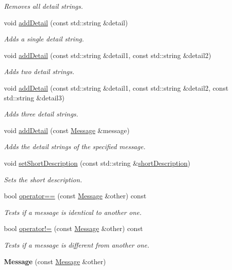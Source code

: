 \begin{DoxyCompactItemize}
\begin{DoxyCompactList}\small\item\em Removes all detail strings. \end{DoxyCompactList}\item 
void \hyperlink{class_message_a7cc56c24bc9d7516247cd865c472ab2f}{add\+Detail} (const std\+::string \&detail)
\begin{DoxyCompactList}\small\item\em Adds a single detail string. \end{DoxyCompactList}\item 
void \hyperlink{class_message_a2c67e0d82c3b4e3f3d21cec40537d6de}{add\+Detail} (const std\+::string \&detail1, const std\+::string \&detail2)
\begin{DoxyCompactList}\small\item\em Adds two detail strings. \end{DoxyCompactList}\item 
void \hyperlink{class_message_a9d83e2c5fd0d817291331e65830b824a}{add\+Detail} (const std\+::string \&detail1, const std\+::string \&detail2, const std\+::string \&detail3)
\begin{DoxyCompactList}\small\item\em Adds three detail strings. \end{DoxyCompactList}\item 
void \hyperlink{class_message_a576d9d2c563c11ff0a000d22bb235d1c}{add\+Detail} (const \hyperlink{class_message}{Message} \&message)
\begin{DoxyCompactList}\small\item\em Adds the detail strings of the specified message. \end{DoxyCompactList}\item 
void \hyperlink{class_message_a3f2362cf70c38b79a188dd8545d24d03}{set\+Short\+Description} (const std\+::string \&\hyperlink{class_message_a9bd82d96b57df5c4615b6cbbf318175a}{short\+Description})
\begin{DoxyCompactList}\small\item\em Sets the short description. \end{DoxyCompactList}\item 
bool \hyperlink{class_message_a30387c914e7f0125a38f2819b9f43e04}{operator==} (const \hyperlink{class_message}{Message} \&other) const 
\begin{DoxyCompactList}\small\item\em Tests if a message is identical to another one. \end{DoxyCompactList}\item 
bool \hyperlink{class_message_a5abc9c637b0c4ec2b7966ea06bd1401b}{operator!=} (const \hyperlink{class_message}{Message} \&other) const 
\begin{DoxyCompactList}\small\item\em Tests if a message is different from another one. \end{DoxyCompactList}\item 
\hypertarget{class_message_ad253b20930e70257e2523bb9fc7d299c}{{\bfseries Message} (const \hyperlink{class_message}{Message} \&other)}\label{class_message_ad253b20930e70257e2523bb9fc7d299c}


\end{DoxyCompactItemize}
